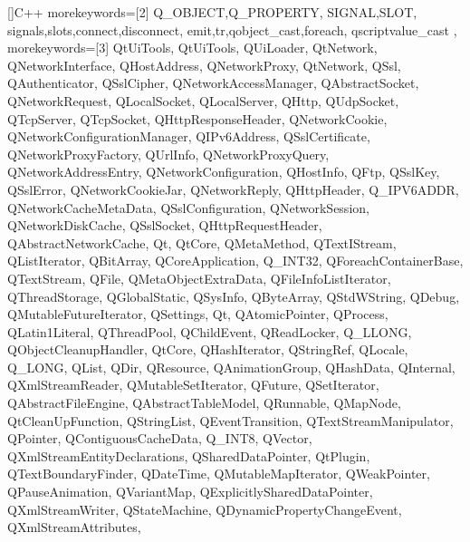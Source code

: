 []{C++}%
{%
  morekeywords=[2]{%
    Q_OBJECT,Q_PROPERTY,%
    SIGNAL,SLOT,%
    signals,slots,connect,disconnect,%
    emit,tr,qobject_cast,foreach,%
    qscriptvalue_cast%
  },%
  morekeywords=[3]{%
    QtUiTools,%
    QtUiTools,%
    QUiLoader,%
    QtNetwork,%
    QNetworkInterface,%
    QHostAddress,%
    QNetworkProxy,%
    QtNetwork,%
    QSsl,%
    QAuthenticator,%
    QSslCipher,%
    QNetworkAccessManager,%
    QAbstractSocket,%
    QNetworkRequest,%
    QLocalSocket,%
    QLocalServer,%
    QHttp,%
    QUdpSocket,%
    QTcpServer,%
    QTcpSocket,%
    QHttpResponseHeader,%
    QNetworkCookie,%
    QNetworkConfigurationManager,%
    QIPv6Address,%
    QSslCertificate,%
    QNetworkProxyFactory,%
    QUrlInfo,%
    QNetworkProxyQuery,%
    QNetworkAddressEntry,%
    QNetworkConfiguration,%
    QHostInfo,%
    QFtp,%
    QSslKey,%
    QSslError,%
    QNetworkCookieJar,%
    QNetworkReply,%
    QHttpHeader,%
    Q_IPV6ADDR,%
    QNetworkCacheMetaData,%
    QSslConfiguration,%
    QNetworkSession,%
    QNetworkDiskCache,%
    QSslSocket,%
    QHttpRequestHeader,%
    QAbstractNetworkCache,%
    Qt,%
    QtCore,%
    QMetaMethod,%
    QTextIStream,%
    QListIterator,%
    QBitArray,%
    QCoreApplication,%
    Q_INT32,%
    QForeachContainerBase,%
    QTextStream,%
    QFile,%
    QMetaObjectExtraData,%
    QFileInfoListIterator,%
    QThreadStorage,%
    QGlobalStatic,%
    QSysInfo,%
    QByteArray,%
    QStdWString,%
    QDebug,%
    QMutableFutureIterator,%
    QSettings,%
    Qt,%
    QAtomicPointer,%
    QProcess,%
    QLatin1Literal,%
    QThreadPool,%
    QChildEvent,%
    QReadLocker,%
    Q_LLONG,%
    QObjectCleanupHandler,%
    QtCore,%
    QHashIterator,%
    QStringRef,%
    QLocale,%
    Q_LONG,%
    QList,%
    QDir,%
    QResource,%
    QAnimationGroup,%
    QHashData,%
    QInternal,%
    QXmlStreamReader,%
    QMutableSetIterator,%
    QFuture,%
    QSetIterator,%
    QAbstractFileEngine,%
    QAbstractTableModel,%
    QRunnable,%
    QMapNode,%
    QtCleanUpFunction,%
    QStringList,%
    QEventTransition,%
    QTextStreamManipulator,%
    QPointer,%
    QContiguousCacheData,%
    Q_INT8,%
    QVector,%
    QXmlStreamEntityDeclarations,%
    QSharedDataPointer,%
    QtPlugin,%
    QTextBoundaryFinder,%
    QDateTime,%
    QMutableMapIterator,%
    QWeakPointer,%
    QPauseAnimation,%
    QVariantMap,%
    QExplicitlySharedDataPointer,%
    QXmlStreamWriter,%
    QStateMachine,%
    QDynamicPropertyChangeEvent,%
    QXmlStreamAttributes,%
}}
